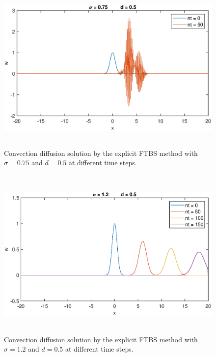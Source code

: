 \documentclass[letterpaper,12pt]{article}
\begin{document}
\begin{figure}[!ht] 
	\centering 
	\includegraphics[max height=8.5cm]{graphs/FTBS/ConvectionDiffusion/sigma075d05.eps}
	\caption{Convection diffusion solution by the explicit FTBS method with $\sigma= 0.75$ and $d=0.5$ at different time steps.}
	 \label{fig:FTBSsigma075d05}
\end{figure}
\begin{figure}[!ht] 
	\centering 
	\includegraphics[max height=8.5cm]{graphs/FTBS/ConvectionDiffusion/sigma12d05.eps}
	\caption{Convection diffusion solution by the explicit FTBS method with $\sigma= 1.2$ and $d=0.5$ at different time steps.}
	 \label{fig:FTBSsigma12d05}
\end{figure}
\newpage
\end{document}
